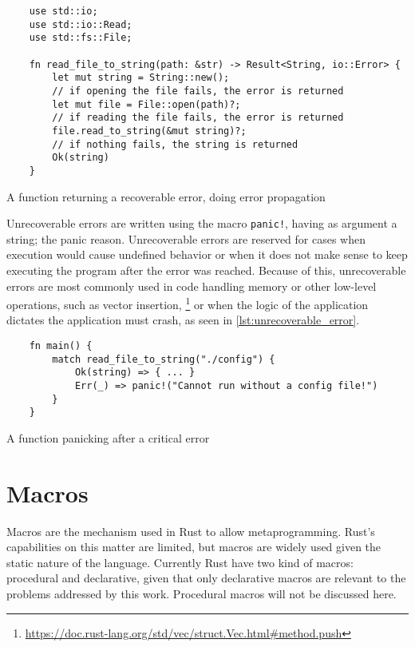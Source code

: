 \begin{listing}[ht]
	\begin{verbatim}
    use std::io;
    use std::io::Read;
    use std::fs::File;

    fn read_file_to_string(path: &str) -> Result<String, io::Error> {
        let mut string = String::new();
        // if opening the file fails, the error is returned
        let mut file = File::open(path)?;
        // if reading the file fails, the error is returned
        file.read_to_string(&mut string)?;
        // if nothing fails, the string is returned
        Ok(string)
    }
    \end{verbatim}
  \caption{A function returning a recoverable error, doing error propagation}
  \label{lst:recoverable_error}
\end{listing}

Unrecoverable errors are written using the macro \texttt{panic!}, having as argument a string; the panic reason. Unrecoverable errors are reserved for cases when execution would cause undefined behavior or when it does not make sense to keep executing the program after the error was reached. Because of this, unrecoverable errors are most commonly used in code handling memory or other low-level operations, such as vector insertion, \footnote{\url{https://doc.rust-lang.org/std/vec/struct.Vec.html\#method.push}} or when the logic of the application dictates the application must crash, as seen in \ref{lst:unrecoverable_error}.


\begin{listing}[ht]
	\begin{verbatim}
    fn main() {
        match read_file_to_string("./config") {
            Ok(string) => { ... }
            Err(_) => panic!("Cannot run without a config file!")
        }
    }
    \end{verbatim}
  \caption{A function panicking after a critical error}
  \label{lst:unrecoverable_error}
\end{listing}

\section{Macros}
Macros are the mechanism used in Rust to allow metaprogramming. Rust's capabilities on this matter are limited, but macros are widely used given the static nature of the language. Currently Rust have two kind of macros: procedural and declarative, given that only declarative macros are relevant to the problems addressed by this work. Procedural macros will not be discussed here.

